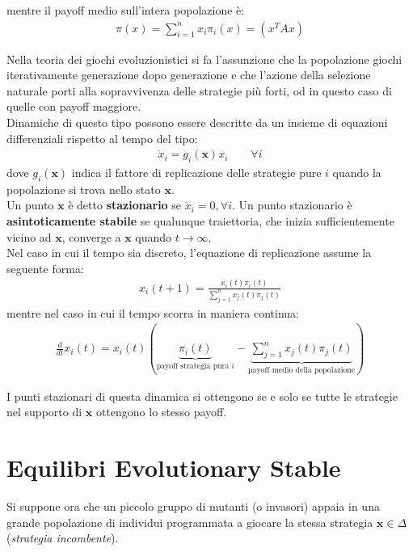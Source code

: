 mentre il payoff medio sull'intera popolazione è:
\begin{align}
	\pi (x) = \sum_{i=1}^n x_i \pi_i(x) = (x^T A x)
\end{align}

Nella teoria dei giochi evoluzionistici si fa l’assunzione che la popolazione giochi iterativamente generazione dopo generazione e che l’azione della selezione naturale porti alla sopravvivenza delle strategie più forti, od in questo caso di quelle con payoff maggiore.\\

Dinamiche di questo tipo possono essere descritte da un insieme di equazioni differenziali rispetto al tempo del tipo:
\begin{align*}
    \dot{x}_i = g_i(\mathbf{x}) x_i \qquad \forall{i}
\end{align*}
dove $g_i(\mathbf{x})$ indica il fattore di replicazione delle strategie pure $i$ quando la popolazione si trova nello stato $\mathbf{x}$. \\

Un punto $\mathbf{x}$ è detto \textbf{stazionario} se $\dot{x}_i = 0, \forall i$. Un punto stazionario è \textbf{asintoticamente stabile} se qualunque traiettoria, che inizia sufficientemente vicino ad $\mathbf{x}$, converge a $\mathbf{x}$ quando $t \rightarrow \infty$.\\

Nel caso in cui il tempo sia discreto, l'equazione di replicazione assume la seguente forma:
\begin{align}
	x_i(t + 1) = \frac{x_i(t) \pi_i(t)}{\displaystyle\sum_{j=1}^n x_j(t) \pi_j(t)}
\end{align}
mentre nel caso in cui il tempo scorra in maniera continua:
\begin{align}
	\frac{d}{dt} x_i(t) = x_i(t) \left( \underbrace{\pi_i(t)}_\textrm{payoff strategia pura $i$} - \underbrace{\sum_{j=1}^n x_j(t) \pi_j(t)}_\textrm{payoff medio della popolazione} \right)
\end{align}

I punti stazionari di questa dinamica si ottengono se e solo se tutte le strategie nel supporto di $\mathbf{x}$ ottengono lo stesso payoff. 






\section{Equilibri Evolutionary Stable} %
\label{sec:equilibri_evolutionary_stable}
Si suppone ora che un piccolo gruppo di mutanti (o invasori) appaia in una grande popolazione di individui programmata a giocare la stessa strategia $\mathbf{x} \in \Delta$ (\emph{strategia incombente}).\\

